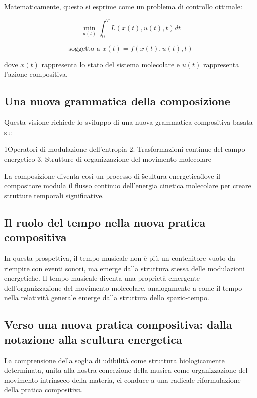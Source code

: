 \documentclass[a4paper,11pt]{article}
\begin{document}
Matematicamente, questo si esprime come un problema di controllo
ottimale:

\begin{equation}
\min_{u(t)} \int_0^T L(x(t), u(t), t)dt
\end{equation}

\begin{equation}
\text{soggetto a } \dot{x}(t) = f(x(t), u(t), t)
\end{equation}


dove $x(t)$ rappresenta lo stato del sistema molecolare e $u(t)$
rappresenta l'azione compositiva.

\subsection{Una nuova grammatica della composizione}

Questa visione richiede lo sviluppo di una nuova grammatica compositiva
basata su:

1\. Operatori di modulazione dell'entropia 2. Trasformazioni continue
del campo energetico 3. Strutture di organizzazione del movimento
molecolare

La composizione diventa così un processo di \"scultura energetica\" dove
il compositore modula il flusso continuo dell'energia cinetica
molecolare per creare strutture temporali significative.

\subsection{Il ruolo del tempo nella nuova pratica compositiva}

In questa prospettiva, il tempo musicale non è più un contenitore vuoto
da riempire con eventi sonori, ma emerge dalla struttura stessa delle
modulazioni energetiche. Il tempo musicale diventa una proprietà
emergente dell'organizzazione del movimento molecolare, analogamente a
come il tempo nella relatività generale emerge dalla struttura dello
spazio-tempo.

\subsection{Verso una nuova pratica compositiva: dalla notazione alla scultura energetica}

La comprensione della soglia di udibilità come struttura biologicamente
determinata, unita alla nostra concezione della musica come
organizzazione del movimento intrinseco della materia, ci conduce a una
radicale riformulazione della pratica compositiva.
\end{document}
